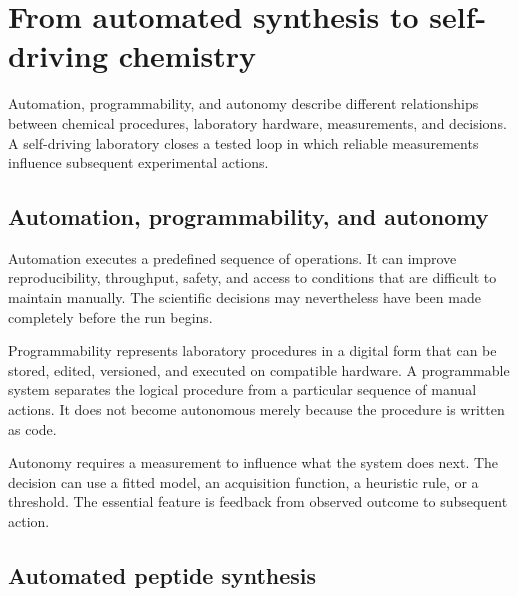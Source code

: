 
\chapter{From automated synthesis to self-driving chemistry}

\begin{notebox}
  Automation, programmability, and autonomy describe different relationships between chemical procedures, laboratory hardware, measurements, and decisions.
  A self-driving laboratory closes a tested loop in which reliable measurements influence subsequent experimental actions.
\end{notebox}

\section{Automation, programmability, and autonomy}

Automation executes a predefined sequence of operations.
It can improve reproducibility, throughput, safety, and access to conditions that are difficult to maintain manually.
The scientific decisions may nevertheless have been made completely before the run begins.

Programmability represents laboratory procedures in a digital form that can be stored, edited, versioned, and executed on compatible hardware.
A programmable system separates the logical procedure from a particular sequence of manual actions.
It does not become autonomous merely because the procedure is written as code.

Autonomy requires a measurement to influence what the system does next.
The decision can use a fitted model, an acquisition function, a heuristic rule, or a threshold.
The essential feature is feedback from observed outcome to subsequent action.

\begin{conceptbox}
\end{conceptbox}

\section{Automated peptide synthesis}

